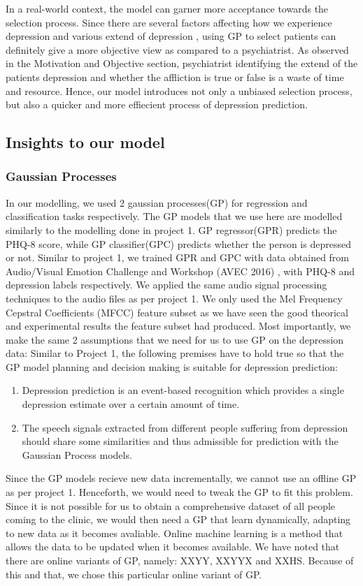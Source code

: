 \documentclass{article}
\begin{document}
	In a real-world context, the model can garner more acceptance towards the selection process.
	Since there are several factors affecting how we experience depression and various extend of depression \cite{nimh2015}, using GP to select patients can definitely give a more objective view as compared to a psychiatrist.
	As observed in the Motivation and Objective section, psychiatrist identifying the extend of the patients depression and whether the affliction is true or false is a waste of time and resource.
	Hence, our model introduces not only a unbiased selection process, but also a quicker and more effiecient process of depression prediction.

	\subsection{Insights to our model}
	\subsubsection{Gaussian Processes} 
In our modelling, we used 2 gaussian processes(GP) for regression and classification tasks respectively. The GP models that we use here are modelled similarly to the modelling done in project 1. GP regressor(GPR) predicts the PHQ-8 score, while GP classifier(GPC) predicts whether the person is depressed or not. Similar to project 1, we trained GPR and GPC with data obtained from Audio/Visual Emotion Challenge and Workshop (AVEC 2016) \cite{avec2016}, with PHQ-8 and depression labels respectively. We applied the same audio signal processing techniques to the audio files as per project 1. We only used the Mel Frequency Cepstral Coefficients (MFCC) feature subset as we have seen the good theorical and experimental results the feature subset had produced. Most importantly, we make the same 2 assumptions that we need for us to use GP on the depression data: 
	Similar to Project 1, the following premises have to hold true so that the GP model planning and decision making is suitable for depression prediction:
	\begin{enumerate}
		\item Depression prediction is an event-based recognition which provides a single depression estimate over a certain amount of time. \cite{Valstar2016}
		\item The speech signals extracted from different people suffering from depression should share some similarities and thus admissible for prediction with the Gaussian Process models\cite{Cummins2015}.
	\end{enumerate}
Since the GP models recieve new data incrementally, we cannot use an offline GP as per project 1. Henceforth, we would need to tweak the GP to fit this problem. Since it is not possible for us to obtain a comprehensive dataset of all people coming to the clinic, we would then need a GP that learn dynamically, adapting to new data as it becomes avaliable. Online machine learning is a method that allows the data to be updated when it becomes available. We have noted that there are online variants of GP, namely: XXYY, XXYYX and XXHS. Because of this and that, we chose this particular online variant of GP. 
	
\end{document}
